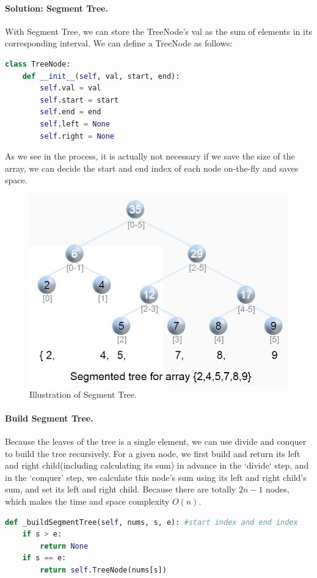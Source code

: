 \documentclass[data-structure.tex]{subfiles}
\begin{document}
\begin{examples}[resume]
\paragraph{Solution: Segment Tree.}  With Segment Tree, we can store the TreeNode's val as the sum of elements in its corresponding interval. We can define a TreeNode as follows:
\begin{lstlisting}[language=Python]
class TreeNode:
    def __init__(self, val, start, end):
        self.val = val
        self.start = start
        self.end = end
        self.left = None
        self.right = None
\end{lstlisting}
As we see in the process, it is actually not necessary if we save the size of the array, we can decide the start and end index of each node on-the-fly and saves space. 
\begin{figure}[h]
    \centering
    \includegraphics[width=0.8\columnwidth]{fig/307_RSQ_SegmentTree.png}
    \caption{Illustration of Segment Tree. }
    \label{fig:segment_tree}
\end{figure}
\paragraph{Build Segment Tree.} Because the leaves of the tree is a single element, we can use divide and conquer to build the tree recursively.  For a given node, we first build and return its left and right child(including calculating its sum) in advance in the `divide` step, and in the `conquer' step, we calculate this node's sum using its left and right child's sum, and set its left and right child. Because there are totally $2n-1$ nodes, which makes the time and space complexity $O(n)$.
\begin{lstlisting}[language=Python]
def _buildSegmentTree(self, nums, s, e): #start index and end index
    if s > e:
        return None
    if s == e:
        return self.TreeNode(nums[s])
    

\end{lstlisting}
\end{examples}
\end{document}
